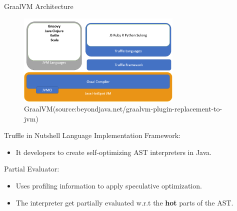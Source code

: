 \begin{frame}{GraalVM Architecture}
    \begin{figure}[h]
        \centering
        \includegraphics[width=0.7\textwidth]{images/graalvmArchitecture}
        \caption{GraalVM\tiny{(source:beyondjava.net/graalvm-plugin-replacement-to-jvm)}}
        \label{fig:graalvmArchitecture}
    \end{figure}
\end{frame}

\begin{frame}{Truffle in Nutshell}
        Language Implementation Framework:
        \begin{itemize}
            \vspace{3mm}
            \item It developers to create self-optimizing AST interpreters in Java.
        \end{itemize}
        \vspace{3mm}
        Partial Evaluator:
        \begin{itemize}
            \vspace{3mm}
            \item Uses profiling information to apply speculative optimization.
            \vspace{3mm}
            \item The interpreter get partially evaluated w.r.t the \textbf{hot} parts of the AST.
        \end{itemize}
\end{frame}

